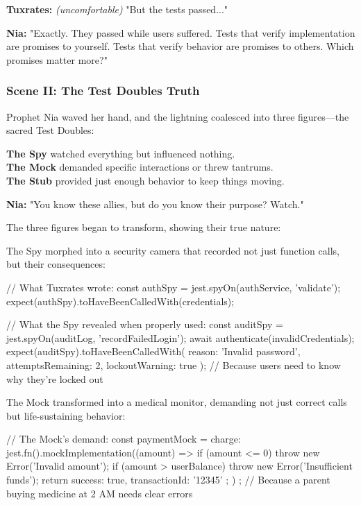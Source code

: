 \textbf{Tuxrates:} \emph{(uncomfortable)} "But the tests passed..."

\textbf{Nia:} "Exactly. They passed while users suffered. Tests that verify implementation are promises to yourself. Tests that verify behavior are promises to others. Which promises matter more?"

\bookdivider

\subsubsection{Scene II: The Test Doubles\textquotesingle{} Truth}\label{scene-ii-the-test-doubles-truth}

Prophet Nia waved her hand, and the lightning coalesced into three figures---the sacred Test Doubles:

\textbf{The Spy} watched everything but influenced nothing.\\
\textbf{The Mock} demanded specific interactions or threw tantrums.\\
\textbf{The Stub} provided just enough behavior to keep things moving.

\textbf{Nia:} "You know these allies, but do you know their purpose? Watch."

The three figures began to transform, showing their true nature:

The Spy morphed into a security camera that recorded not just function calls, but their consequences:

\begin{codeblock}
// What Tuxrates wrote:
const authSpy = jest.spyOn(authService, 'validate');
expect(authSpy).toHaveBeenCalledWith(credentials);

// What the Spy revealed when properly used:
const auditSpy = jest.spyOn(auditLog, 'recordFailedLogin');
await authenticate(invalidCredentials);
expect(auditSpy).toHaveBeenCalledWith({
  reason: 'Invalid password',
  attemptsRemaining: 2,
  lockoutWarning: true
});
// Because users need to know why they're locked out
\end{codeblock}

The Mock transformed into a medical monitor, demanding not just correct calls but life-sustaining behavior:

\begin{codeblock}
// The Mock's demand:
const paymentMock = {
  charge: jest.fn().mockImplementation((amount) => {
    if (amount <= 0) throw new Error('Invalid amount');
    if (amount > userBalance) throw new Error('Insufficient funds');
    return { success: true, transactionId: '12345' };
  })
};
// Because a parent buying medicine at 2 AM needs clear errors
\end{codeblock}

